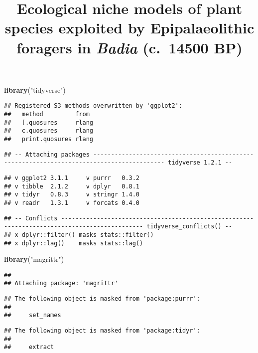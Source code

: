 \documentclass[]{article}
\title{Ecological niche models of plant species exploited by Epipalaeolithic
foragers in \emph{Badia} (c.~14500 BP)}
\author{}
\date{}
\newenvironment{Shaded}{\begin{snugshade}}{\end{snugshade}}
\newcommand{\KeywordTok}[1]{\textcolor[rgb]{0.13,0.29,0.53}{\textbf{#1}}}
\newcommand{\NormalTok}[1]{#1}
\newcommand{\StringTok}[1]{\textcolor[rgb]{0.31,0.60,0.02}{#1}}
\begin{document}
\maketitle

\begin{Shaded}
\begin{Highlighting}[]
\KeywordTok{library}\NormalTok{(}\StringTok{"tidyverse"}\NormalTok{)}
\end{Highlighting}
\end{Shaded}

\begin{verbatim}
## Registered S3 methods overwritten by 'ggplot2':
##   method         from 
##   [.quosures     rlang
##   c.quosures     rlang
##   print.quosures rlang
\end{verbatim}

\begin{verbatim}
## -- Attaching packages ------------------------------------------------------------------------------------------ tidyverse 1.2.1 --
\end{verbatim}

\begin{verbatim}
## v ggplot2 3.1.1     v purrr   0.3.2
## v tibble  2.1.2     v dplyr   0.8.1
## v tidyr   0.8.3     v stringr 1.4.0
## v readr   1.3.1     v forcats 0.4.0
\end{verbatim}

\begin{verbatim}
## -- Conflicts --------------------------------------------------------------------------------------------- tidyverse_conflicts() --
## x dplyr::filter() masks stats::filter()
## x dplyr::lag()    masks stats::lag()
\end{verbatim}

\begin{Shaded}
\begin{Highlighting}[]
\KeywordTok{library}\NormalTok{(}\StringTok{"magrittr"}\NormalTok{)}
\end{Highlighting}
\end{Shaded}

\begin{verbatim}
## 
## Attaching package: 'magrittr'
\end{verbatim}

\begin{verbatim}
## The following object is masked from 'package:purrr':
## 
##     set_names
\end{verbatim}

\begin{verbatim}
## The following object is masked from 'package:tidyr':
## 
##     extract
\end{verbatim}
\end{document}
